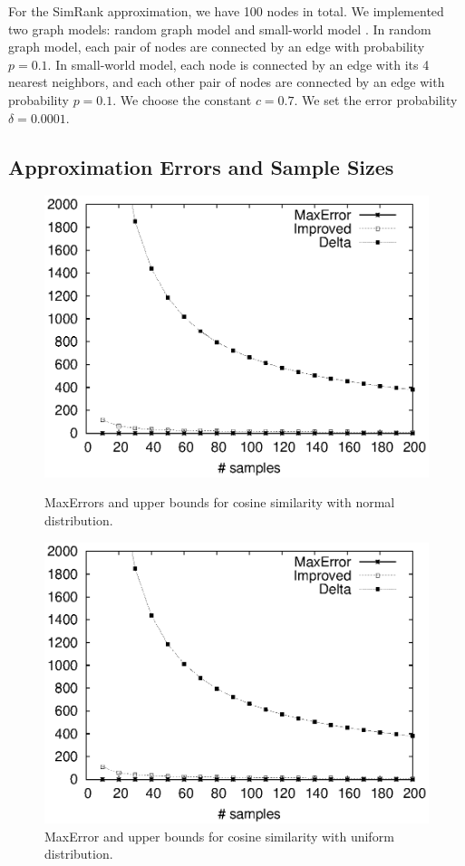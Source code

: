 \documentclass{article}
\begin{document}
For the SimRank approximation, we have 100 nodes in total. We implemented two graph models: random graph model \cite{Gil59} and small-world model \cite{WS98}. In random graph model, each pair of nodes are connected by an edge with probability $p=0.1$. In small-world model, each node is connected by an edge with its 4 nearest neighbors, and each other pair of nodes are connected by an edge with probability $p=0.1$. We choose the constant $c=0.7$. We set the error probability $\delta = 0.0001$.

\subsection{Approximation Errors and Sample Sizes}

\begin{figure}[!t]
\centering
\begin{minipage}{.45\textwidth}
\centering
\includegraphics[width=.9\textwidth]{cos_normal_apprx_error.eps}
\caption{\textsf{MaxError}s and upper bounds for cosine similarity with normal distribution.}
\label{fig:cnae}
\end{minipage}
\hspace{1cm}
\begin{minipage}{.45\textwidth}
\centering
\includegraphics[width=.9\textwidth]{cos_uniform_apprx_error.eps}
\caption{\textsf{MaxError} and upper bounds for cosine similarity with uniform distribution.}
\label{fig:cuae}
\end{minipage}
\end{figure}
\end{document}
